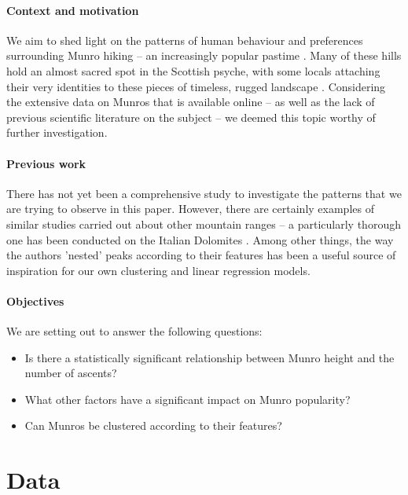 \documentclass[11pt,a4paper]{article}
\begin{document}
\paragraph{Context and motivation}

We aim to shed light on the patterns of human behaviour and preferences surrounding Munro hiking – an increasingly popular pastime \cite{CSM}. Many of these hills hold an almost sacred spot in the Scottish psyche, with some locals attaching their very identities to these pieces of timeless, rugged landscape \cite{HAE}. Considering the extensive data on Munros that is available online – as well as the lack of previous scientific literature on the subject – we deemed this topic worthy of further investigation.

\paragraph{Previous work}

There has not yet been a comprehensive study to investigate the patterns that we are trying to observe in this paper. However, there are certainly examples of similar studies carried out about other mountain ranges – a particularly thorough one has been conducted on the Italian Dolomites \cite{HitA}. Among other things, the way the authors 'nested' peaks according to their features has been a useful source of inspiration for our own clustering and linear regression models. 

\paragraph{Objectives}

We are setting out to answer the following questions:
\begin{itemize}
    \item Is there a statistically significant relationship between Munro height and the number of ascents?
    \item What other factors have a significant impact on Munro popularity?
    \item Can Munros be clustered according to their features?
\end{itemize}
\section{Data}
\end{document}
